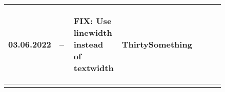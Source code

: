 \begin{tiny}
\begin{longtable}{ | p{0.06\linewidth} | p{0.08\linewidth} | p{0.06\linewidth} | P{0.49\linewidth} | p{0.15\linewidth} | }
        03.06.2022               &
        --                       &
        \begin{tsLTItemize}
            \item FIX: Use linewidth instead of textwidth
        \end{tsLTItemize}
                                 &
        ThirtySomething            \\
        \hline
    \end{longtable}
\end{tiny}
